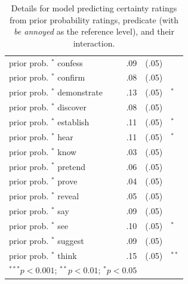 \documentclass[11pt,fleqn]{article}
\newcommand{\6}{\mbox{$[\hspace*{-.6mm}[$}}
\newcommand{\9}{\mbox{$]\hspace*{-.6mm}]$}}
\begin{document}
\begin{table}
\begin{center}
\begin{tabular}{l r r l}
prior prob. $^*$ confess     &.09 & (.05)     \\
prior prob. $^*$ confirm     &.08 & (.05)     \\
prior prob. $^*$ demonstrate &.13 & (.05) & $^{*}$    \\
prior prob. $^*$ discover    &.08 & (.05)     \\
prior prob. $^*$ establish   &.11 & (.05) & $^{*}$    \\
prior prob. $^*$ hear        &.11 & (.05) & $^{*}$    \\
prior prob. $^*$ know        &.03 & (.05)     \\
prior prob. $^*$ pretend     &.06 & (.05)     \\
prior prob. $^*$ prove       &.04 & (.05)     \\
prior prob. $^*$ reveal      &.05 & (.05)     \\
prior prob. $^*$ say         &.09 & (.05)     \\
prior prob. $^*$ see         &.10 & (.05) & $^{*}$    \\
prior prob. $^*$ suggest     &.09 & (.05)     \\
prior prob. $^*$ think       &.15 & (.05) & $^{**}$   \\
\bottomrule
\multicolumn{2}{l}{\scriptsize{$^{***}p<0.001$; $^{**}p<0.01$; $^{*}p<0.05$}}
\end{tabular}
\caption{Details for model predicting certainty ratings from prior probability ratings, predicate (with {\em be annoyed} as the reference level), and their interaction.}
\label{table:coefficients-prior}
\end{center}
\end{table}
\end{document}
